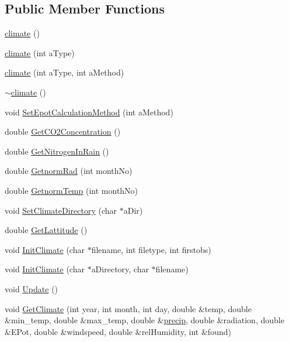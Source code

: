 \subsection*{Public Member Functions}
\begin{DoxyCompactItemize}
\item 
\hyperlink{classclimate_a36f8f651987de205d69337c77b0b5b4c}{climate} ()
\item 
\hyperlink{classclimate_a1aa74cca9a2e637a100ed24830f312b1}{climate} (int aType)
\item 
\hyperlink{classclimate_ae0c8369f72a3801988c9cc3798db4503}{climate} (int aType, int aMethod)
\item 
\hyperlink{classclimate_ab145ad6b1f8d82e8ab385386e25eb9c2}{$\sim$climate} ()
\item 
void \hyperlink{classclimate_a9395948a8e53f92bf3a56074f337c3e2}{SetEpotCalculationMethod} (int aMethod)
\item 
double \hyperlink{classclimate_a14e9a0d27f51b514217508b04f53ca04}{GetCO2Concentration} ()
\item 
double \hyperlink{classclimate_ab8a4bb39891b9e00f8e9f06645e7b8de}{GetNitrogenInRain} ()
\item 
double \hyperlink{classclimate_a2f109ffd62417e7151c7c816291bdbc8}{GetnormRad} (int monthNo)
\item 
double \hyperlink{classclimate_acabf247267712ae1a2d35358e3cc03f7}{GetnormTemp} (int monthNo)
\item 
void \hyperlink{classclimate_a60376d9b9f2a73043315165121d970d4}{SetClimateDirectory} (char $\ast$aDir)
\item 
double \hyperlink{classclimate_a0df68cae9a2272f9b45e6d9006c932b5}{GetLattitude} ()
\item 
void \hyperlink{classclimate_af5d7b934fee70b30e504080310c4989e}{InitClimate} (char $\ast$filename, int filetype, int firstobs)
\item 
void \hyperlink{classclimate_a29094eda7fd66a0aa17883633df94cce}{InitClimate} (char $\ast$aDirectory, char $\ast$filename)
\item 
void \hyperlink{classclimate_ab8380f4e16a95955cb1707899166e65d}{Update} ()
\item 
void \hyperlink{classclimate_ab7d0b27317c6e374e52c945da88ef74a}{GetClimate} (int year, int month, int day, double \&temp, double \&min\_\-temp, double \&max\_\-temp, double \&\hyperlink{classclimate_ac1c70fe3427c4e4aa014997eccc069e3}{precip}, double \&radiation, double \&EPot, double \&windspeed, double \&relHumidity, int \&found)

\end{DoxyCompactItemize}
